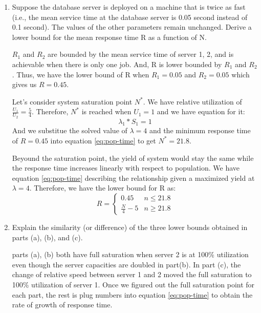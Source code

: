\documentclass[letterpaper]{article}
\begin{document}
\begin{enumerate}
\begin{enumerate}
\item{} Suppose the database server is deployed on a machine that is twice as fast (i.e., the mean service time at the database server is 0.05 second instead of 0.1 second). The values of the other parameters remain unchanged. Derive a lower bound for the mean response time R as a function of N.

$R_1$ and $R_2$ are bounded by the mean service time of server 1, 2, and is achievable when there is only one job. And, R is lower bounded by $R_1$ and $R_2$. Thus, we have the lower bound of R when $R_1 = 0.05$ and $R_2 = 0.05$ which gives us $R = 0.45$.

Let's consider system saturation point $N^*$. We have relative utilization of $\frac{U_1}{U_2} = \frac{5}{4}$. Therefore, $N^*$ is reached when $U_1 = 1$ and we have equation for it:
\begin{equation}
\lambda_1 * S_1 = 1
\end{equation}
And we substitue the solved value of $\lambda = 4$ and the minimum response time of $R = 0.45$ into equation \ref{eq:pop-time} to get  $N^* = 21.8$.

Beyound the saturation point, the yield of system would stay the same while the response time increases linearly with respect to population. We have equation \ref{eq:pop-time} describing the relationship given a maximized yield at $\lambda = 4$. Therefore, we have the lower bound for R as:
\begin{equation*}
R = \begin{cases}
               0.45                                     & n \le 21.8\\
               \frac{N}{4} - 5                      & n \ge 21.8
           \end{cases}
\end{equation*}

\item{} Explain the similarity (or difference) of the three lower bounds obtained in parts (a), (b), and (c).

parts (a), (b) both have full saturation when server 2 is at 100\% utilization even though the server capacities are doubled in part(b). In part (c), the change of relative speed between server 1 and 2 moved the full saturation to 100\% utilization of server 1. Once we figured out the full saturation point for each part, the rest is plug numbers into equation \ref{eq:pop-time} to obtain the rate of growth of response time.
\end{enumerate}

\end{enumerate}
\end{document}
